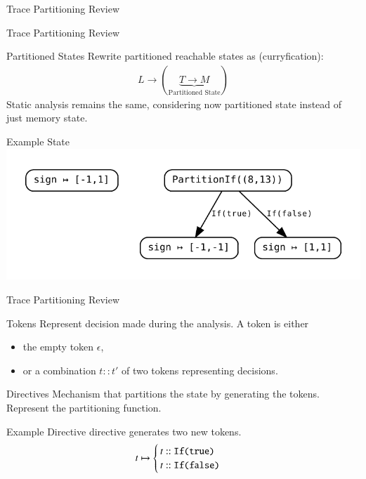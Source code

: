 \documentclass{beamer}
\begin{document}
\begin{section}{Trace Partitioning Review}

	\begin{frame}[t]{Trace Partitioning Review}
		\begin{block}{Partitioned States}
			Rewrite partitioned reachable states as (curryfication):
			\begin{align}
				L \to (\underbrace{T \to M}_{\text{Partitioned State}})
			\end{align}
			Static analysis remains the same, considering now partitioned state instead of just memory state.
		\end{block}

		\begin{block}{Example State}
			\includegraphics[width=\textwidth]{Graphs/PartitionedState.pdf}
		\end{block}
	\end{frame}


	\begin{frame}[t]{Trace Partitioning Review}
		\begin{block}{Tokens}
			Represent decision made during the analysis. A token is either
			\begin{itemize}
				\item the empty token $\epsilon$,
				\item or a combination $t::t'$ of two tokens representing decisions.
			\end{itemize}
		\end{block}

		\begin{block}{Directives}
			Mechanism that partitions the state by generating the tokens. Represent the partitioning function.
		\end{block}

		\begin{block}{Example Directive}
			 directive generates two new tokens.
			\begin{align}
				t \mapsto 
				\begin{cases}
					t::\texttt{If(true)}\\
					t::\texttt{If(false)}
				\end{cases}
			\end{align}
		\end{block}
	\end{frame}


\end{section}
\end{document}
